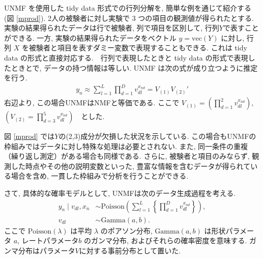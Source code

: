\documentclass[a4paper,12ptc, dvipdfmx]{jsarticle} %
\begin{document}
UNMF を使用した tidy data 形式での行列分解を, 簡単な例を通じて紹介する (図 \ref{mprod}). 2人の被験者に対し実験で 3 つの項目の観測値が得られたとする. 実験の結果得られたデータは行で被験者, 列で項目を区別して, 行列$Y$で表すことができる. 一方, 実験の結果得られたデータをベクトル $y = \mathrm{vec}(Y)$ に対し, 行列 $X$ を被験者と項目を表すダミー変数で表現することもできる. これは tidy data の形式と直接対応する.　行列で表現したときと tidy data の形式で表現したときとで, データの持つ情報は等しい. UNMF は次の式が成り立つように推定を行う.
\begin{align*}
y_{n}  \approx \sum_{l=1}^L \prod_{d=1}^D v_{dl}^{x_{nd}} = V_{(1)}V_ {(2)}'
\end{align*}
右辺より, この場合UNMFはNMFと等価である. ここで $V_{(1)} = (\prod_{d=1}^2 v_{dl}^{x_{nd}})$, $(V_{(2)} = \prod_{d=3}^5 v_{dl}^{x_{nd}}) $　とした.

図 \ref{mprod} では$Y$の(2,3)成分が欠損した状況を示している. この場合もUNMFの枠組みではデータに対し特殊な処理は必要とされない. また, 同一条件の重複（繰り返し測定）がある場合も同様である. さらに, 被験者と項目のみならず,  観測した時点やその他の説明変数といった, 豊富な情報を含むデータが得られている場合を含め, 一貫した枠組みで分析を行うことができる.

さて, 具体的な確率モデルとして, UNMFは次のデータ生成過程を考える.
\begin{align}
y_{n} \mid v_{dl}, x_{n} & \sim \mathrm{Poisson}\left(\sum_{l=1}^{L} \left\{\prod_{d=1}^{D}v_{dl}^{x_{nd}} \right\} \right),  \label{geney}\\
v_{dl} & \sim \mathrm{Gamma}(a,b).\nonumber
\end{align}
ここで $\mathrm{Poisson}(\lambda)$ は平均 $\lambda$ のポアソン分布, $\mathrm{Gamma}(a,b)$ は形状パラメータ $a$, レートパラメータ$b$ のガンマ分布, およびそれらの確率密度を意味する. ガンマ分布はパラメータ$V$に対する事前分布として置いた.　
\end{document}
